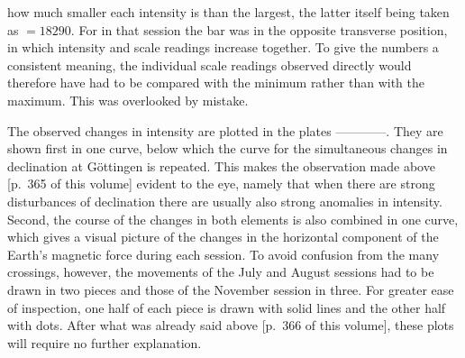 how much smaller each intensity is than the largest, the latter itself being taken as $=18290$. For in that session the bar was in the opposite transverse position, in which intensity and scale readings increase together. To give the numbers a consistent meaning, the individual scale readings observed directly would therefore have had to be compared with the minimum rather than with the maximum. This was overlooked by mistake.

The observed changes in intensity are plotted in the plates ---\quad---\quad---\quad---. They are shown first in one curve, below which the curve for the simultaneous changes in declination at Göttingen is repeated. This makes the observation made above [p.\ 365 of this volume] evident to the eye, namely that when there are strong disturbances of declination there are usually also strong anomalies in intensity. Second, the course of the changes in both elements is also combined in one curve, which gives a visual picture of the changes in the horizontal component of the Earth’s magnetic force during each session. To avoid confusion from the many crossings, however, the movements of the July and August sessions had to be drawn in two pieces and those of the November session in three. For greater ease of inspection, one half of each piece is drawn with solid lines and the other half with dots. After what was already said above [p.\ 366 of this volume], these plots will require no further explanation.

